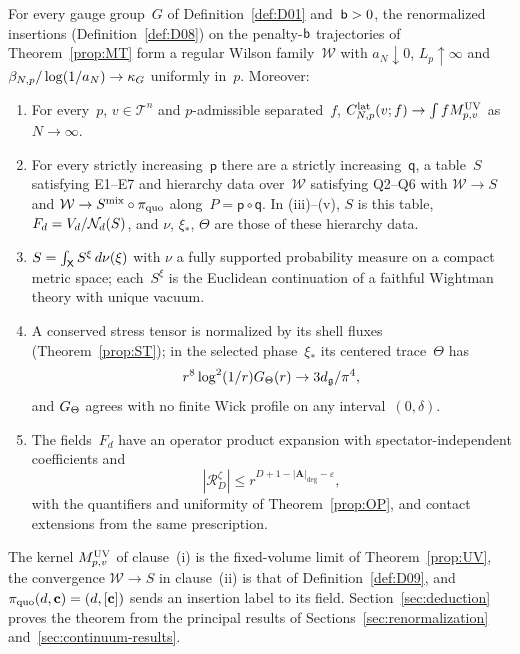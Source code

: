 \setcounter{maintheorem}{1}
\begin{maintheorem}\label{thm:B}
For every gauge group~$G$ of Definition~\ref{def:D01} and~$\mathsf{b}>0$, the renormalized insertions (Definition~\ref{def:D08}) on the penalty-$\mathsf{b}$ trajectories of Theorem~\ref{prop:MT} form a regular Wilson family~$\mathcal W$ with $a_N\downarrow0$, $L_p\uparrow\infty$ and $\beta_{N,p}/\log(1/a_N)\to\kappa_G$ uniformly in~$p$. Moreover:
\begin{enumerate}[label=\textup{(\roman*)},ref=\roman*]
\item\label{it:B1} For every~$p$, $v\in\mathcal T^n$ and $p$-admissible separated~$f$, $C^{\mathrm{lat}}_{N,p}(v;f)\to\int fM^{\rm UV}_{p,v}$ as $N\to\infty$.
\item\label{it:B2} For every strictly increasing~$\mathsf p$ there are a strictly increasing~$\mathsf q$, a table~$S$ satisfying E1--E7 and hierarchy data over~$\mathcal W$ satisfying Q2--Q6 with $\mathcal W\to S$ and $\mathcal W\to S^{\rm mix}\circ\pi_{\rm quo}$ along~$P=\mathsf p\circ\mathsf q$. In (iii)--(v), $S$ is this table, $F_d=V_d/\mathcal{N}_{d}(S)$, and $\nu$, $\xi_*$, $\Theta$ are those of these hierarchy data.
\item\label{it:B3} $S=\int_{\mathsf{X}}S^\xi\,d\nu(\xi)$ with $\nu$ a fully supported probability measure on a compact metric space; each~$S^\xi$ is the Euclidean continuation of a faithful Wightman theory with unique vacuum.
\item\label{it:B4} A conserved stress tensor is normalized by its shell fluxes (Theorem~\ref{prop:ST}); in the selected phase~$\xi_*$ its centered trace~$\Theta$ has
\begin{equation*}
r^8\log^2(1/r)G_{\Theta}(r)\to3d_{\mathfrak{g}}/\pi^4,
\end{equation*}
and $G_{\Theta}$ agrees with no finite Wick profile on any interval~$(0,\delta)$.
\item\label{it:B5} The fields~$F_d$ have an operator product expansion with spectator-independent coefficients and
\begin{equation*}
|\mathcal R_D^\zeta|\le r^{D+1-|\boldsymbol A|_{\deg}-\varepsilon},
\end{equation*}
with the quantifiers and uniformity of Theorem~\ref{prop:OP}, and contact extensions from the same prescription.
\end{enumerate}
\end{maintheorem}

The kernel $M^{\rm UV}_{p,v}$ of clause~(i) is the fixed-volume limit of Theorem~\ref{prop:UV}, the convergence $\mathcal W\to S$ in clause~(ii) is that of Definition~\ref{def:D09}, and $\pi_{\rm quo}(d,\mathbf c)=(d,[\mathbf c])$ sends an insertion label to its field. Section~\ref{sec:deduction} proves the theorem from the principal results of Sections~\ref{sec:renormalization} and~\ref{sec:continuum-results}.

